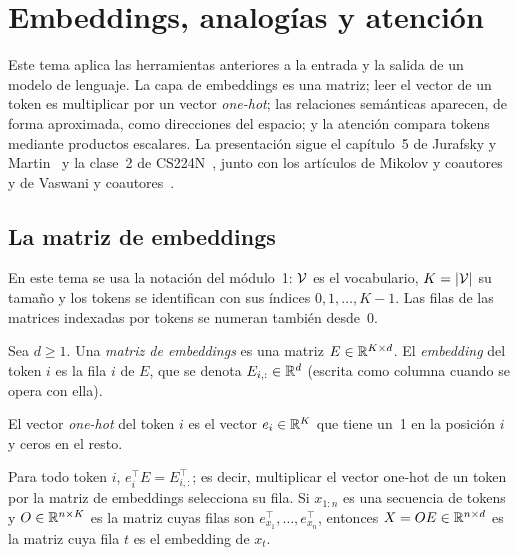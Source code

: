 \chapter{Embeddings, analogías y atención}
\label{tema:5}

Este tema aplica las herramientas anteriores a la entrada y la salida de un modelo de lenguaje. La capa de embeddings es una matriz; leer el vector de un token es multiplicar por un vector \emph{one-hot}; las relaciones semánticas aparecen, de forma aproximada, como direcciones del espacio; y la atención compara tokens mediante productos escalares. La presentación sigue el capítulo~5 de Jurafsky y Martin~\cite{jm3} y la clase~2 de CS224N~\cite{cs224n}, junto con los artículos de Mikolov y coautores~\cite{mikolov-a,mikolov-b} y de Vaswani y coautores~\cite{vaswani}.

\section{La matriz de embeddings}

En este tema se usa la notación del módulo~1: $\mathcal{V}$ es el vocabulario, $K=\lvert\mathcal{V}\rvert$ su tamaño y los tokens se identifican con sus índices $0,1,\dots,K-1$. Las filas de las matrices indexadas por tokens se numeran también desde~0.

\begin{definicion}\label{def:embedding}
Sea $d\ge 1$. Una \emph{matriz de embeddings} es una matriz $E\in\mathbb{R}^{K\times d}$. El \emph{embedding} del token $i$ es la fila $i$ de $E$, que se denota $E_{i,:}\in\mathbb{R}^{d}$ (escrita como columna cuando se opera con ella).
\end{definicion}

\begin{definicion}
El vector \emph{one-hot} del token $i$ es el vector $e_i\in\mathbb{R}^{K}$ que tiene un~1 en la posición $i$ y ceros en el resto.
\end{definicion}

\begin{proposicion}\label{prop:onehot}
Para todo token $i$, $e_i^{\top}E=E_{i,:}^{\top}$; es decir, multiplicar el vector one-hot de un token por la matriz de embeddings selecciona su fila. Si $x_{1:n}$ es una secuencia de tokens y $O\in\mathbb{R}^{n\times K}$ es la matriz cuyas filas son $e_{x_1}^{\top},\dots,e_{x_n}^{\top}$, entonces $X=OE\in\mathbb{R}^{n\times d}$ es la matriz cuya fila $t$ es el embedding de $x_t$.
\end{proposicion}

